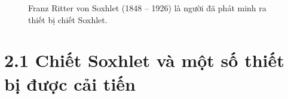 \documentclass[
  twocolumn,
  landscape]{report}
\begin{document}
\begin{figure}


\caption{\label{fig-Franz}Franz Ritter von Soxhlet (1848 -- 1926) là
người đã phát minh ra thiết bị chiết Soxhlet.}

\end{figure}%

\section{2.1 Chiết Soxhlet và một số thiết bị được cải
tiến}\label{chiux1ebft-soxhlet-vuxe0-mux1ed9t-sux1ed1-thiux1ebft-bux1ecb-ux111ux1b0ux1ee3c-cux1ea3i-tiux1ebfn}
\end{document}
